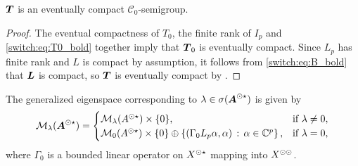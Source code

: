 \begin{proposition}\label{switch:prop:compact_bold}
  $\boldsymbol{T}$ is an eventually compact $\mathcal{C}_0$-semigroup.
\end{proposition}
\begin{proof}
The eventual compactness of $T_0$, the finite rank of $I_p$ and \cref{switch:eq:T0_bold} together imply that $\boldsymbol{T}_0$ is eventually compact. Since $L_p$ has finite rank and $L$ is compact by assumption, it follows from \cref{switch:eq:B_bold} that $\boldsymbol{L}$ is compact, so $\boldsymbol{T}$ is eventually compact by \cite[Theorem 2.8]{diekmann2007stability}.
\end{proof}

\begin{theorem}
  \label{switch:thm:eigspaces_bold}
  The generalized eigenspace corresponding to $\lambda \in \sigma(\boldsymbol{A}^{\odot\star})$ is given by
  \[
    \mathcal{M}_{\lambda}(\boldsymbol{A}^{\odot\star}) =
    \begin{cases}
      \mathcal{M}_{\lambda}(A^{\odot\star}) \times \{0\}, &\text{if } \lambda \neq 0,\\
      \mathcal{M}_0(A^{\odot\star}) \times \{0\} \oplus
    \left\{ \left(\Gamma_0L_p\alpha, \alpha\right) \,:\, \alpha \in \mathbb{C}^p \right\}, &\text{if } \lambda = 0,
    \end{cases}
  \]
  where $\Gamma_0$ is a bounded linear operator on $X^{\odot\star}$ mapping into $X^{\odot\odot}$.
\end{theorem}
